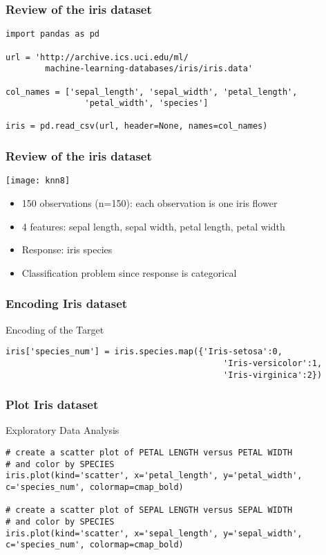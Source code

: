 \begin{frame}[fragile]\frametitle{Review of the iris dataset}
\begin{lstlisting}
import pandas as pd

url = 'http://archive.ics.uci.edu/ml/
		machine-learning-databases/iris/iris.data'
		
col_names = ['sepal_length', 'sepal_width', 'petal_length',
				'petal_width', 'species']
				
iris = pd.read_csv(url, header=None, names=col_names)

\end{lstlisting}
\end{frame}

\begin{frame}[fragile]\frametitle{Review of the iris dataset}
\begin{center}
\texttt{[image: knn8]}
\end{center}
\begin{itemize}
\item 150 observations (n=150): each observation is one iris flower
\item 4 features: sepal length, sepal width, petal length, petal width
\item Response: iris species
\item Classification problem since response is categorical
\end{itemize}
\end{frame}


\begin{frame}[fragile]\frametitle{Encoding Iris dataset}
Encoding of the Target
\begin{lstlisting}
iris['species_num'] = iris.species.map({'Iris-setosa':0, 
											'Iris-versicolor':1, 
											'Iris-virginica':2})
\end{lstlisting}
\end{frame}


\begin{frame}[fragile]\frametitle{Plot Iris dataset}
Exploratory Data Analysis
\begin{lstlisting}
# create a scatter plot of PETAL LENGTH versus PETAL WIDTH 
# and color by SPECIES
iris.plot(kind='scatter', x='petal_length', y='petal_width', c='species_num', colormap=cmap_bold)

# create a scatter plot of SEPAL LENGTH versus SEPAL WIDTH 
# and color by SPECIES
iris.plot(kind='scatter', x='sepal_length', y='sepal_width', c='species_num', colormap=cmap_bold)
\end{lstlisting}
\end{frame}

